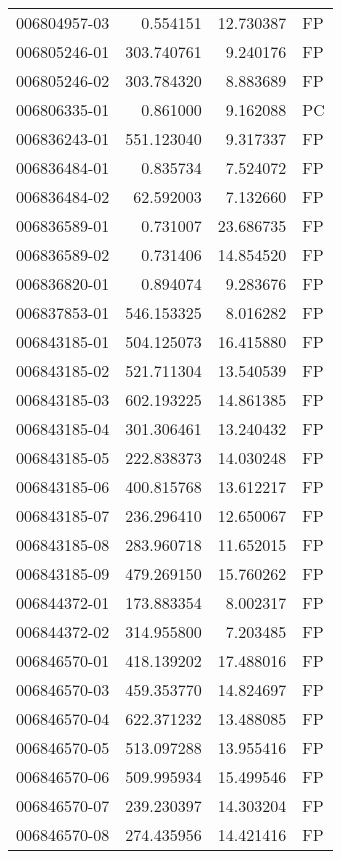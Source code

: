 \begin{tabular}{lrrl}
006804957-03 &    0.554151 &    12.730387 &   FP \\
006805246-01 &  303.740761 &     9.240176 &   FP \\
006805246-02 &  303.784320 &     8.883689 &   FP \\
006806335-01 &    0.861000 &     9.162088 &   PC \\
006836243-01 &  551.123040 &     9.317337 &   FP \\
006836484-01 &    0.835734 &     7.524072 &   FP \\
006836484-02 &   62.592003 &     7.132660 &   FP \\
006836589-01 &    0.731007 &    23.686735 &   FP \\
006836589-02 &    0.731406 &    14.854520 &   FP \\
006836820-01 &    0.894074 &     9.283676 &   FP \\
006837853-01 &  546.153325 &     8.016282 &   FP \\
006843185-01 &  504.125073 &    16.415880 &   FP \\
006843185-02 &  521.711304 &    13.540539 &   FP \\
006843185-03 &  602.193225 &    14.861385 &   FP \\
006843185-04 &  301.306461 &    13.240432 &   FP \\
006843185-05 &  222.838373 &    14.030248 &   FP \\
006843185-06 &  400.815768 &    13.612217 &   FP \\
006843185-07 &  236.296410 &    12.650067 &   FP \\
006843185-08 &  283.960718 &    11.652015 &   FP \\
006843185-09 &  479.269150 &    15.760262 &   FP \\
006844372-01 &  173.883354 &     8.002317 &   FP \\
006844372-02 &  314.955800 &     7.203485 &   FP \\
006846570-01 &  418.139202 &    17.488016 &   FP \\
006846570-03 &  459.353770 &    14.824697 &   FP \\
006846570-04 &  622.371232 &    13.488085 &   FP \\
006846570-05 &  513.097288 &    13.955416 &   FP \\
006846570-06 &  509.995934 &    15.499546 &   FP \\
006846570-07 &  239.230397 &    14.303204 &   FP \\
006846570-08 &  274.435956 &    14.421416 &   FP \\

\end{tabular}
